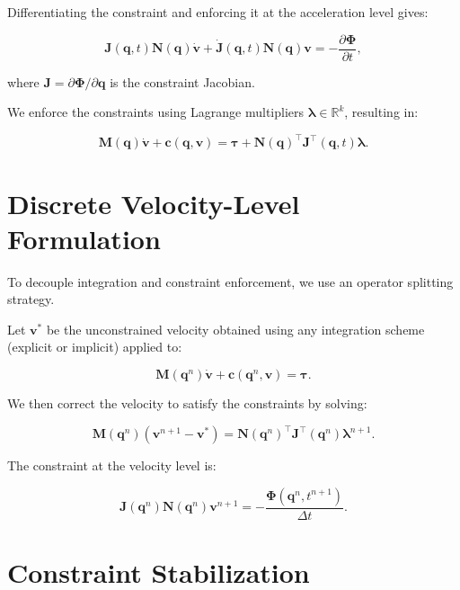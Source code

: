 \documentclass{article}
\begin{document}
Differentiating the constraint and enforcing it at the acceleration level gives:

\begin{equation}
    \bm{J}(\bm{q}, t) \bm{N}(\bm{q}) \dot{\bm{v}} + \dot{\bm{J}}(\bm{q}, t) \bm{N}(\bm{q}) \bm{v} = -\frac{\partial \bm{\Phi}}{\partial t},
\end{equation}

where \( \bm{J} = \partial \bm{\Phi} / \partial \bm{q} \) is the constraint
Jacobian.

We enforce the constraints using Lagrange multipliers \( \bm{\lambda} \in
\mathbb{R}^k \), resulting in:

\begin{equation}
    \bm{M}(\bm{q}) \dot{\bm{v}} + \bm{c}(\bm{q}, \bm{v}) = \bm{\tau} + \bm{N}(\bm{q})^\top \bm{J}^\top(\bm{q}, t) \bm{\lambda}.
\end{equation}

\section{Discrete Velocity-Level Formulation}

To decouple integration and constraint enforcement, we use an operator splitting
strategy.

Let \( \bm{v}^* \) be the unconstrained velocity obtained using any integration
scheme (explicit or implicit) applied to:

\begin{equation}
    \bm{M}(\bm{q}^n) \dot{\bm{v}} + \bm{c}(\bm{q}^n, \bm{v}) = \bm{\tau}.
\end{equation}

We then correct the velocity to satisfy the constraints by solving:

\begin{equation}
    \bm{M}(\bm{q}^n)(\bm{v}^{n+1} - \bm{v}^*) = \bm{N}(\bm{q}^n)^\top \bm{J}^\top(\bm{q}^n) \bm{\lambda}^{n+1}.
\end{equation}

The constraint at the velocity level is:

\begin{equation}
    \bm{J}(\bm{q}^n) \bm{N}(\bm{q}^n) \bm{v}^{n+1} = -\frac{\bm{\Phi}(\bm{q}^n, t^{n+1})}{\Delta t}.
\end{equation}

\section{Constraint Stabilization}
\end{document}
